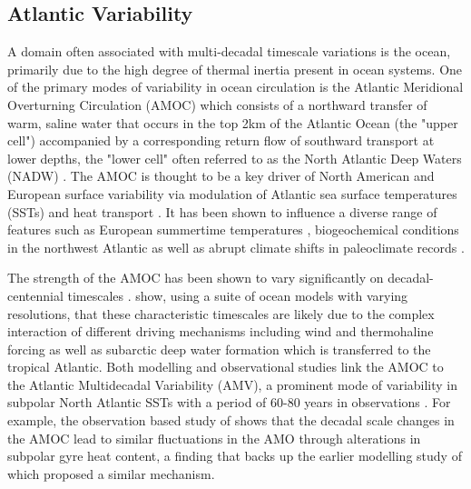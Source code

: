 \subsection{Atlantic Variability}
A domain often associated with multi-decadal timescale variations is the ocean, primarily due to the high degree of thermal inertia present in ocean systems. One of the primary modes of variability in ocean circulation is the Atlantic Meridional Overturning Circulation (AMOC) which consists of a northward transfer of warm, saline water that occurs in the top 2km of the Atlantic Ocean (the "upper cell") accompanied by a corresponding return flow of southward transport at lower depths, the "lower cell" often referred to as the North Atlantic Deep Waters (NADW) \citep{kuhlbrodtDriving2007b, xuIntraseasonal2014b, buckleyObservations2016d}. The AMOC is thought to be a key driver of North American and European surface variability via modulation of Atlantic sea surface temperatures (SSTs) and heat transport \citep{knightSignature2005b, delworthObserved2000b, friersonContribution2013b, frankignoulInfluence2013b}. It has been shown to influence a diverse range of features such as European summertime temperatures \citep{suttonAtlantic2005b}, biogeochemical conditions in the northwest Atlantic \citep{lavoieProjections2019b} as well as abrupt climate shifts in paleoclimate records \citep{alleyWally2007c, chengIce2009c}. 

The strength of the AMOC has been shown to vary significantly on decadal-centennial timescales \citep{delworthInterdecadal1993b, biastochCauses2008c, tullochExploring2012b, menaryMultimodel2012b}. \cite{biastochCauses2008c} show, using a suite of ocean models with varying resolutions, that these characteristic timescales are likely due to the complex interaction of different driving mechanisms including wind and thermohaline forcing as well as subarctic deep water formation which is transferred to the tropical Atlantic. Both modelling and observational studies link the AMOC to the Atlantic Multidecadal Variability (AMV), a prominent mode of variability in subpolar North Atlantic SSTs with a period of 60-80 years in observations \citep{zhangReview2019}. For example, the observation based study of \cite{mccarthyOcean2015} shows that the decadal scale changes in the AMOC lead to similar fluctuations in the AMO through alterations in subpolar gyre heat content, a finding that backs up the earlier modelling study of \cite{delworthObserved2000b} which proposed a similar mechanism.

